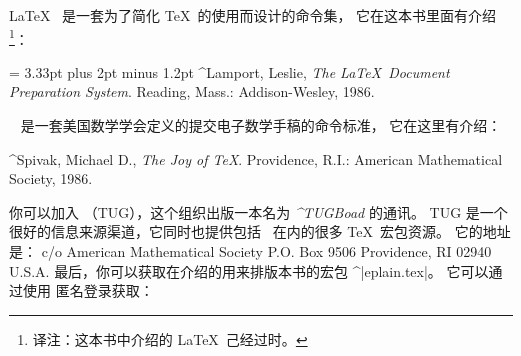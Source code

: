 \LaTeX\  是一套为了简化 \TeX\ 的使用而设计的命令集，
它在这本书里面有介绍\footnote{译注：这本书中介绍的 \LaTeX\ 己经过时。}：
\smallskip
{\narrower\noindent\frenchspacing\spaceskip = 3.33pt plus 2pt minus 1.2pt
^{Lamport, Leslie}, {\sl The \LaTeX\ Document Preparation System}.
Reading, Mass.: Addison-Wesley, 1986.\par}
\smallskip
\noindent
\AMSTeX\  是一套美国数学学会定义的提交电子数学手稿的命令标准，
它在这里有介绍：
\smallskip
{\narrower\noindent
^{Spivak, Michael D.}, {\sl The Joy of \TeX}. Providence, R.I.:
American Mathematical Society, 1986.
\par}
\smallskip
\noindent
你可以加入 \TeXyhz{}（TUG），这个组织出版一本名为 {\it ^{TUGBoad}} 的通讯。
TUG 是一个很好的信息来源渠道，它同时也提供包括 \AMSTeX\ 在内的很多 \TeX\ 宏包资源。
它的地址是：
\smallskip
{\obeylines
\TeXyhz{}
c/o American Mathematical Society
P.O. Box 9506
Providence,  RI  02940
U.S.A.
}
\smallskip
\noindent
最后，你可以获取在介绍的用来排版本书的宏包 ^|eplain.tex|。
它可以通过使用 \ftp 匿名登录获取：
{\obeylines{}}

